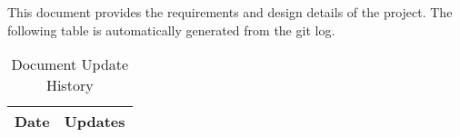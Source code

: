This document provides the requirements and design details of the project.
The following table is automatically generated from the git log.

\begin{longtable}{|l||p{13.5cm}|}
	\caption{Document Update History \label{Table::UpdateHistory}} \\
	\hline
	\textbf{Date} & \textbf{Updates}                               \\
	\hline
	\endhead

	
\end{longtable}